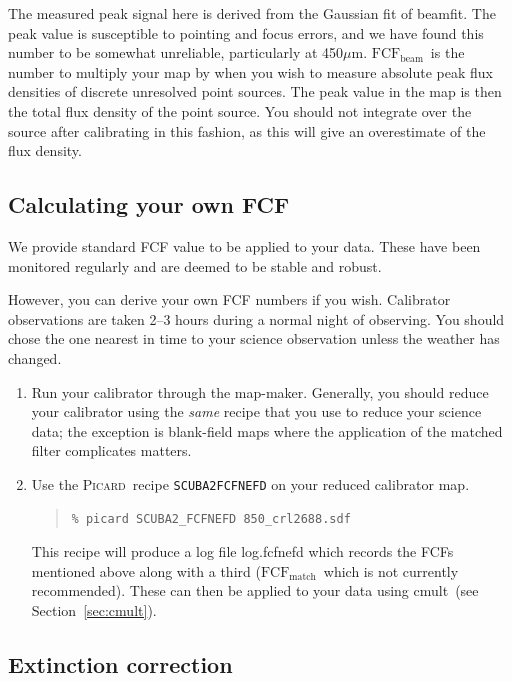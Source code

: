 \documentclass[twoside,11pt]{article}
\newcommand{\htmlref}[2]{#1}
\newcommand{\latexhtml}[2]{#1}
\newcommand{\xref}[3]{#1}
\newcommand{\xlabel}[1]{}
\renewcommand{\_}{\texttt{\symbol{95}}}
\newenvironment{myquote}{\begin{quote}\begin{small}}{\end{small}\end{quote}}
\newcommand{\fcfb}{$\mathrm{FCF_{beam}}$}
\newcommand{\fcfm}{$\mathrm{FCF_{match}}$}
\newcommand{\picard}{\xref{\textsc{Picard}}{sun265}{}}
\newcommand{\task}[1]{\textsf{#1}}
\newcommand{\beamfit}{\xref{\task{beamfit}}{sun95}{BEAMFIT}}
\newcommand{\cmult}{\xref{\task{cmult}}{sun95}{CMULT}}
\newcommand{\cref}[3]{\latexhtml{#1~\ref{#2}}{\htmlref{#3}{#2}}}
\begin{document}
The measured peak signal here is derived from the Gaussian fit of
\beamfit. The peak value is susceptible to pointing and focus errors,
and we have found this number to be somewhat unreliable, particularly
at 450$\mu$m. \fcfb\ is the number to multiply your
map by when you wish to measure absolute peak flux densities of
discrete unresolved point sources. The peak value in the map is then
the total flux density of the point source. You should not integrate
over the source after calibrating in this fashion, as this will give
an overestimate of the flux density.


\subsection{\xlabel{ownfcf}Calculating your own FCF}

We provide standard FCF value to be applied to your data. These have
been monitored regularly and are deemed to be stable and robust.

However, you can derive your own FCF numbers if you wish. Calibrator
observations are taken 2--3 hours during a normal night of observing.
You should chose the one nearest in time to your science observation
unless the weather has changed.

\begin{enumerate}
\item Run your calibrator through the map-maker. Generally, you should
reduce your calibrator using the \emph{same} recipe that you use to
reduce your science data; the exception is blank-field maps where the
application of the matched filter complicates matters.

\item Use the \picard\ recipe \texttt{SCUBA2\_FCFNEFD} on your reduced calibrator map.
\begin{myquote}
\begin{verbatim}
% picard SCUBA2_FCFNEFD 850_crl2688.sdf
\end{verbatim}
\end{myquote}
This recipe will produce a log file log.fcfnefd which records the FCFs
mentioned above along with a third (\fcfm\ which is not currently
recommended). These can then be applied to your data using
\cmult\ (see \cref{Section}{sec:cmult}{Applying the FCF}).
\end{enumerate}

\subsection{\xlabel{extinction}Extinction correction}
\end{document}
